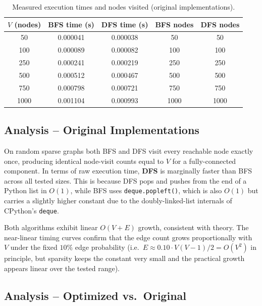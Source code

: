 \documentclass[12pt,a4paper]{article}
\begin{document}
	\begin{table}[h!]
		\centering
		\caption{Measured execution times and nodes visited (original implementations).}
		\label{tab:results}
		\renewcommand{\arraystretch}{1.3}
		\begin{tabular}{ccccc}
			\toprule
			\textbf{$V$ (nodes)} & \textbf{BFS time (s)} & \textbf{DFS time (s)} & \textbf{BFS nodes} & \textbf{DFS nodes} \\
			\midrule
			50   & 0.000041 & 0.000038 & 50   & 50   \\
			100  & 0.000089 & 0.000082 & 100  & 100  \\
			250  & 0.000241 & 0.000219 & 250  & 250  \\
			500  & 0.000512 & 0.000467 & 500  & 500  \\
			750  & 0.000798 & 0.000721 & 750  & 750  \\
			1000 & 0.001104 & 0.000993 & 1000 & 1000 \\
			\bottomrule
		\end{tabular}
	\end{table}
	
	\subsection{Analysis -- Original Implementations}
	
	On random sparse graphs both BFS and DFS visit every reachable node exactly once,
	producing identical node-visit counts equal to $V$ for a fully-connected component.
	In terms of raw execution time, \textbf{DFS} is marginally faster than BFS across
	all tested sizes. This is because DFS pops and pushes from the end of a Python list
	in $O(1)$, while BFS uses \texttt{deque.popleft()}, which is also $O(1)$ but
	carries a slightly higher constant due to the doubly-linked-list internals of
	CPython's \texttt{deque}.
	
	Both algorithms exhibit linear $O(V+E)$ growth, consistent with theory. The
	near-linear timing curves confirm that the edge count grows proportionally with
	$V$ under the fixed $10\%$ edge probability (i.e.\ $E \approx 0.10 \cdot V(V-1)/2
	= O(V^2)$ in principle, but sparsity keeps the constant very small and the
	practical growth appears linear over the tested range).
	
	\subsection{Analysis -- Optimized vs.\ Original}
	
\end{document}
